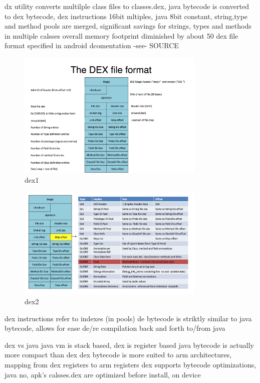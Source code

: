 \cite{kovachevaMaster} \cite{ehringerDalvik}
%

%
dx utility converts multilple class files to classes.dex, java bytecode is converted to dex bytecode, dex instructions 16bit mltiples, java 8bit
constant, string,type and method pools are merged, significant savings for strings, types and methods in multiple calsses
overall memory footprint diminished by about 50%
dex file format specified in android dcomentation -see- SOURCE\newline
\begin{figure}[h]
    \centering
    \includegraphics[width=0.8\textwidth]{data/dex1.png}
    \caption{dex1}
    \label{fig:dex1}
\end{figure}
\begin{figure}[h]
    \centering
    \includegraphics[width=0.8\textwidth]{data/dex2.png}
    \caption{dex2}
    \label{fig:dex2}
\end{figure}
dex instructions refer to indexes (in pools)\newline
de bytecode is striktly similar to java bytecode, allows for ease de/re compilation back and forth to/from java\newline

dex vs java\newline
java vm is stack based, dex is register based
java bytecode is actually more compact than dex
dex bytecode is more suited to arm architectures, mapping from dex registers to arm registers
dex supports bytecode optimizations, java no, apk's calsses.dex are optimized before install, on device\newline
\cite{andevconDalvikART}
%

